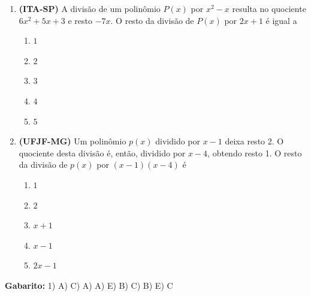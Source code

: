 \documentclass[12pt,a4paper]{article}
\begin{document}
\begin{enumerate}[leftmargin=*, itemsep=0.35cm]
    \item \textbf{(ITA-SP)} A divisão de um polinômio $P(x)$ por $x^2 - x$ resulta no quociente $6x^2 + 5x + 3$ e resto $-7x$. O resto da divisão de $P(x)$ por $2x + 1$ é igual a
    \begin{enumerate}[label=\Alph*)]
        \item $1$
        \item $2$
        \item $3$
        \item $4$
        \item $5$
    \end{enumerate}

    \item \textbf{(UFJF-MG)} Um polinômio $p(x)$ dividido por $x - 1$ deixa resto 2. O quociente desta divisão é, então, dividido por $x - 4$, obtendo resto 1. O resto da divisão de $p(x)$ por $(x - 1)(x - 4)$ é
    \begin{enumerate}[label=\Alph*)]
        \item $1$
        \item $2$
        \item $x + 1$
        \item $x - 1$
        \item $2x - 1$
    \end{enumerate}


\end{enumerate}
\textbf{Gabarito:} 1) A) C) A) A) E) B) C) B) E) C
\end{document}
